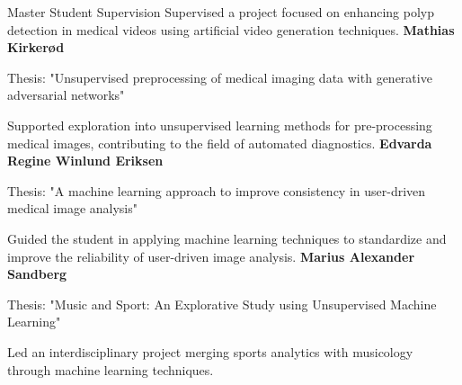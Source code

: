 \begin{rubric}{Master Student Supervision}
    Supervised a project focused on enhancing polyp detection in medical videos using artificial video generation techniques.
    \entry*[2019]%
    \textbf{Mathias Kirkerød} \par
    Thesis: "Unsupervised preprocessing of medical imaging data with generative adversarial networks" \par
    Supported exploration into unsupervised learning methods for pre-processing medical images, contributing to the field of automated diagnostics.
    \entry*[2019]%
    \textbf{Edvarda Regine Winlund Eriksen} \par
    Thesis: "A machine learning approach to improve consistency in user-driven medical image analysis" \par
    Guided the student in applying machine learning techniques to standardize and improve the reliability of user-driven image analysis.
    \entry*[2019]%
    \textbf{Marius Alexander Sandberg} \par
    Thesis: "Music and Sport: An Explorative Study using Unsupervised Machine Learning" \par
    Led an interdisciplinary project merging sports analytics with musicology through machine learning techniques.
\end{rubric}
